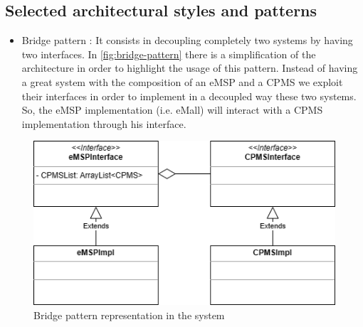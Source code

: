 \subsection{Selected architectural styles and patterns}
\begin{itemize}
    \item Bridge pattern \cite{ref:bridge-pattern}: It consists in decoupling completely two systems by having two interfaces. In \autoref{fig:bridge-pattern} there is a simplification of the architecture in order to highlight the usage of this pattern.
          Instead of having a great system with the composition of an \ac{eMSP} and a \ac{CPMS} we exploit their interfaces in order to implement in a decoupled way these two systems. So, the \ac{eMSP} implementation (i.e. \ac{eMall}) will interact with a \ac{CPMS} implementation through his interface.
\end{itemize}
\begin{figure}[!h]
    \begin{center}
        \includegraphics[keepaspectratio, width=16cm]{Graphics/DD-bridge-pattern.drawio.png}
        \caption{Bridge pattern representation in the system}
        \label{fig:bridge-pattern}
    \end{center}
\end{figure}

